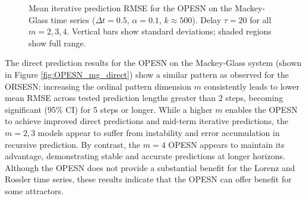 \begin{figure}
    \caption{Mean iterative prediction RMSE for the OPESN on the Mackey-Glass time series ($\Delta t = 0.5$, $\alpha=0.1$, $k\approx500$). Delay $\tau=20$ for all $m=2,3,4$. Vertical bars show standard deviations; shaded regions show full range.}
    \label{fig:OPESN_mg_iterative}
\end{figure}

The direct prediction results for the OPESN on the Mackey-Glass system (shown in Figure \ref{fig:OPESN_mg_direct}) show a similar pattern as observed for the ORSESN: increasing the ordinal pattern dimension $m$ consistently leads to lower mean RMSE across tested prediction lengths greater than 2 steps, becoming significant (95\% CI) for 5 steps or longer. While a higher $m$ enables the OPESN to achieve improved direct predictions and mid-term iterative predictions, the $m=2,3$ models appear to suffer from instability and error accumulation in recursive prediction. By contrast, the $m=4$ OPESN appears to maintain its advantage, demonstrating stable and accurate predictions at longer horizons. Although the OPESN does not provide a substantial benefit for the Lorenz and Rossler time series, these results indicate that the OPESN can offer benefit for some attractors.

